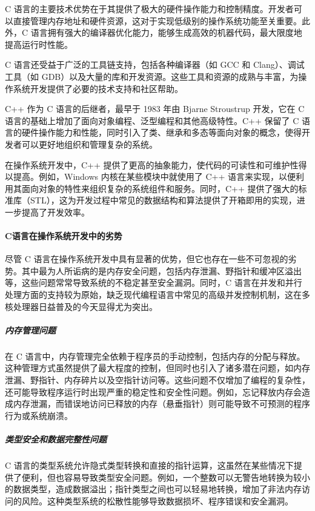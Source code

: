 C 语言的主要技术优势在于其提供了极大的硬件操作能力和控制精度。开发者可以直接管理内存地址和硬件资源，这对于实现低级别的操作系统功能至关重要。此外，C 语言拥有强大的编译器优化能力，能够生成高效的机器代码，最大限度地提高运行时性能。

C 语言还受益于广泛的工具链支持，包括各种编译器（如 GCC 和 Clang）、调试工具（如 GDB）以及大量的库和开发资源。这些工具和资源的成熟与丰富，为操作系统开发提供了必要的技术支持和社区帮助。

C++ 作为 C 语言的后继者，最早于 1983 年由 Bjarne Stroustrup 开发，它在 C 语言的基础上增加了面向对象编程、泛型编程和其他高级特性。C++ 保留了 C 语言的硬件操作能力和性能，同时引入了类、继承和多态等面向对象的概念，使得开发者可以更好地组织和管理复杂的系统。

在操作系统开发中，C++ 提供了更高的抽象能力，使代码的可读性和可维护性得以提高。例如，Windows 内核在某些模块中就使用了 C++ 语言来实现，以便利用其面向对象的特性来组织复杂的系统组件和服务。同时，C++ 提供了强大的标准库（STL），这为开发过程中常见的数据结构和算法提供了开箱即用的实现，进一步提高了开发效率。

\paragraph{C语言在操作系统开发中的劣势}

尽管 C 语言在操作系统开发中具有显著的优势，但它也存在一些不可忽视的劣势。其中最为人所诟病的是内存安全问题，包括内存泄漏、野指针和缓冲区溢出等，这些问题常常导致系统的不稳定甚至安全漏洞。同时，C 语言在并发和并行处理方面的支持较为原始，缺乏现代编程语言中常见的高级并发控制机制，这在多核处理器日益普及的今天显得尤为突出。

\subparagraph{内存管理问题}

在 C 语言中，内存管理完全依赖于程序员的手动控制，包括内存的分配与释放。这种管理方式虽然提供了最大程度的控制，但同时也引入了诸多潜在问题，如内存泄漏、野指针、内存碎片以及空指针访问等。这些问题不仅增加了编程的复杂性，还可能导致程序运行时出现严重的稳定性和安全性问题。例如，忘记释放内存会造成内存泄漏，而错误地访问已释放的内存（悬垂指针）则可能导致不可预测的程序行为或系统崩溃。

\subparagraph{类型安全和数据完整性问题}

C 语言的类型系统允许隐式类型转换和直接的指针运算，这虽然在某些情况下提供了便利，但也容易导致类型安全问题。例如，一个整数可以无警告地转换为较小的数据类型，造成数据溢出；指针类型之间也可以轻易地转换，增加了非法内存访问的风险。这种类型系统的松散性能够导致数据损坏、程序错误和安全漏洞。

